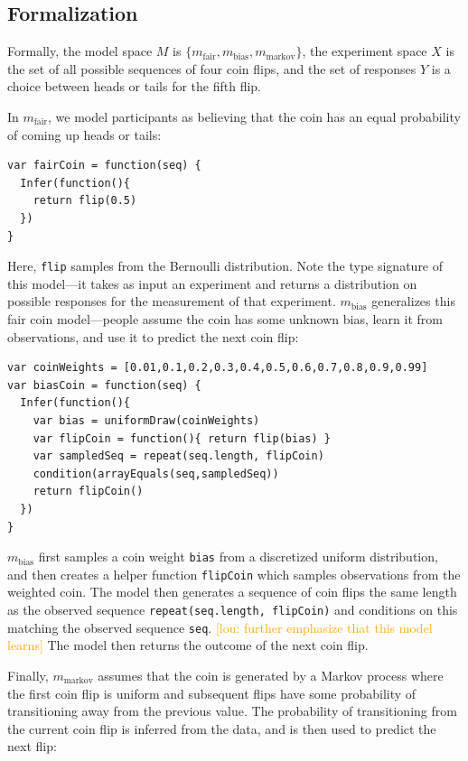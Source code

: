 \documentclass{article}
\newcommand{\lou}[1]{\textcolor{orange}{[lou: #1]}}
\begin{document}
\subsection{Formalization}

Formally, the model space $M$ is $\{m_{\text{fair}}, m_{\text{bias}}, m_{\text{markov}}\}$, the experiment space $X$ is the set of all possible sequences of four coin flips, and the set of responses $Y$ is a choice between heads or tails for the fifth flip.

In $m_{\text{fair}}$, we model participants as believing that the coin has an equal probability of coming up heads or tails:

\begin{lstlisting}[upquote=true]
var fairCoin = function(seq) {
  Infer(function(){
    return flip(0.5)
  })
}
\end{lstlisting}
Here, \lstinline{flip} samples from the Bernoulli distribution.
Note the type signature of this model---it takes as input an experiment and returns a distribution on possible responses for the measurement of that experiment.
$m_{\text{bias}}$ generalizes this fair coin model---people assume the coin has some unknown bias, learn it from observations, and use it to predict the next coin flip:
\begin{lstlisting}[upquote=true]
var coinWeights = [0.01,0.1,0.2,0.3,0.4,0.5,0.6,0.7,0.8,0.9,0.99]
var biasCoin = function(seq) {
  Infer(function(){
    var bias = uniformDraw(coinWeights)
    var flipCoin = function(){ return flip(bias) }
    var sampledSeq = repeat(seq.length, flipCoin)
    condition(arrayEquals(seq,sampledSeq))
    return flipCoin()
  })
}
\end{lstlisting}
$m_{\text{bias}}$ first samples a coin weight \lstinline{bias} from a discretized uniform distribution, and
then creates a helper function \lstinline{flipCoin} which samples observations from the weighted coin.
The model then generates a sequence of coin flips the same length as the observed sequence \lstinline{repeat(seq.length, flipCoin)} and conditions on this matching the observed sequence \lstinline{seq}.
\lou{further emphasize that this model learns}
The model then returns the outcome of the next coin flip.

Finally, $m_{\text{markov}}$ assumes that the coin is generated by a Markov process where the first coin flip is uniform and subsequent flips have some probability of transitioning away from the previous value.
The probability of transitioning from the current coin flip is inferred from the data, and is then used to predict the next flip:
\end{document}
